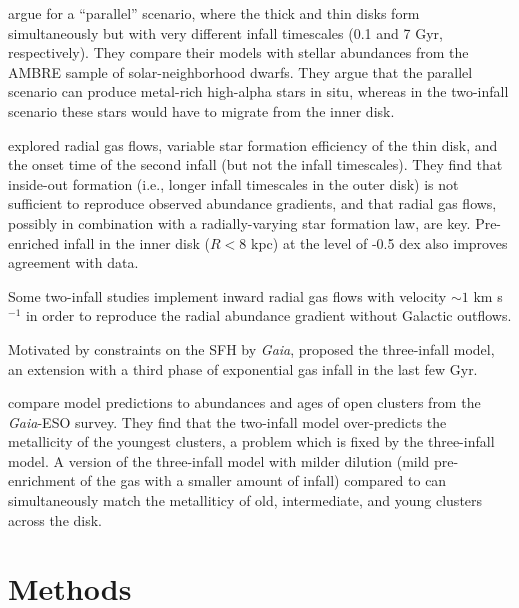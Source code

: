\documentclass[twocolumn,twocolappendix,linenumbers]{aastex631}
\begin{document}
\citet{grisoni_ambre_2017} argue for a ``parallel'' scenario, where the thick and thin disks form simultaneously but with very different infall timescales (0.1 and 7 Gyr, respectively). They compare their models with stellar abundances from the AMBRE sample of solar-neighborhood dwarfs. They argue that the parallel scenario can produce metal-rich high-alpha stars in situ, whereas in the two-infall scenario these stars would have to migrate from the inner disk.

\citet{palla_chemical_2020} explored radial gas flows, variable star formation efficiency of the thin disk, and the onset time of the second infall (but not the infall timescales). They find that inside-out formation (i.e., longer infall timescales in the outer disk) is not sufficient to reproduce observed abundance gradients, and that radial gas flows, possibly in combination with a radially-varying star formation law, are key. Pre-enriched infall in the inner disk ($R<8$ kpc) at the level of -0.5 dex also improves agreement with data.

Some two-infall studies \citep[e.g.,][]{spitoni_effects_2011,palla_chemical_2020,palla_mapping_2024} implement inward radial gas flows with velocity $\sim1$ km s$^{-1}$ in order to reproduce the radial abundance gradient without Galactic outflows.

Motivated by constraints on the SFH by {\it Gaia}, \citet{spitoni_beyond_2023} proposed the three-infall model, an extension with a third phase of exponential gas infall in the last few Gyr.

\citet{palla_mapping_2024} compare model predictions to abundances and ages of open clusters from the {\it Gaia}-ESO survey. They find that the two-infall model over-predicts the metallicity of the youngest clusters, a problem which is fixed by the three-infall model. A version of the three-infall model with milder dilution (mild pre-enrichment of the gas with a smaller amount of infall) compared to \citet{spitoni_beyond_2023} can simultaneously match the metalliticy of old, intermediate, and young clusters across the disk.

\citet{spitoni_remind_2024}

\section{Methods}
\label{sec:methods}
\end{document}

